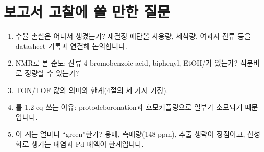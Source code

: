 \documentclass[10pt,a4paper]{article}
\begin{document}
\section{보고서 고찰에 쓸 만한 질문}
\begin{enumerate}[leftmargin=6mm,itemsep=0.5mm]
\item 수율 손실은 어디서 생겼는가? 재결정 에탄올 사용량, 세척량, 여과지 잔류 등을 datasheet 기록과 연결해 논의합니다.
\item NMR로 본 순도: 잔류 4-bromobenzoic acid, biphenyl, EtOH/가 있는가? 적분비로 정량할 수 있는가?
\item TON/TOF 값의 의미와 한계(4절의 세 가지 가정).
\item {}를 1.2 eq 쓰는 이유: protodeboronation과 호모커플링으로 일부가 소모되기 때문입니다.
\item 이 계는 얼마나 ``green''한가? 용매, 촉매량(148 ppm), 추출 생략이 장점이고, 산성화로 생기는 폐염과 Pd 폐액이 한계입니다.
\end{enumerate}

\end{document}
